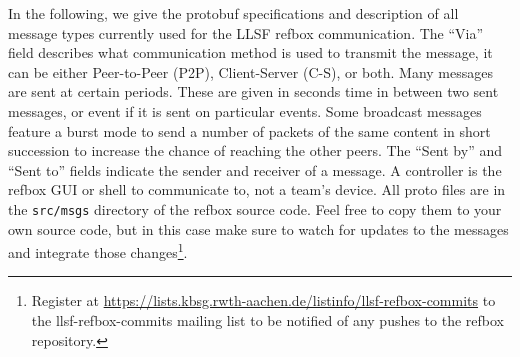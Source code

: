 \documentclass[a4paper]{article}
\begin{document}
In the following, we give the protobuf specifications and description
of all message types currently used for the LLSF refbox
communication. The ``Via'' field describes what communication method
is used to transmit the message, it can be either Peer-to-Peer (P2P),
Client-Server (C-S), or both. Many messages are sent at certain
periods. These are given in seconds time in between two sent messages,
or event if it is sent on particular events. Some broadcast messages
feature a burst mode to send a number of packets of the same content
in short succession to increase the chance of reaching the other
peers. The ``Sent by'' and ``Sent to'' fields indicate the sender and
receiver of a message. A controller is the refbox GUI or shell to
communicate to, not a team's device. All proto files are in the
\texttt{src/msgs} directory of the refbox source code. Feel free to
copy them to your own source code, but in this case make sure to watch
for updates to the messages and integrate those
changes\footnote{Register at
  \url{https://lists.kbsg.rwth-aachen.de/listinfo/llsf-refbox-commits}
  to the llsf-refbox-commits mailing list to be notified of any pushes
  to the refbox repository.}.

\bigskip

\newcommand{\msgspec}[6]{%
\hspace{-1.1\parindent}
\begin{minipage}{\linewidth}
  \begin{minipage}[t]{.48\linewidth}
    \vspace{0pt}
    
      {../../src/msgs/#1}
  \end{minipage}
  \hspace{.01\linewidth}
  \begin{minipage}[t]{.51\linewidth}
    \vspace{2pt}
    \small
    \begin{tabular}{>{\bfseries}ll>{\bfseries}ll}
      File:&\multicolumn{3}{p{.95\linewidth}}{%
        \texttt{#1}
      }\\[3pt]
      Via:&#2&Period:&#3\\
      Sent by:&#4&Sent to:&#5\\[3pt]
      \multicolumn{4}{p{.95\linewidth}}{%
        #6
      }
    \end{tabular}
  \end{minipage}
\end{minipage}
}
\end{document}
